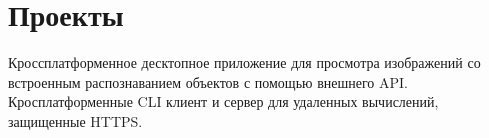 

\section{Проекты}\label{sec:projects}
\resumeSubHeadingListStart
        {Кроссплатформенное десктопное приложение для просмотра изображений со встроенным распознаванием объектов с помощью внешнего API.}
        {Кросплатформенные CLI клиент и сервер для удаленных вычислений, защищенные HTTPS.}
\resumeSubHeadingListEnd
